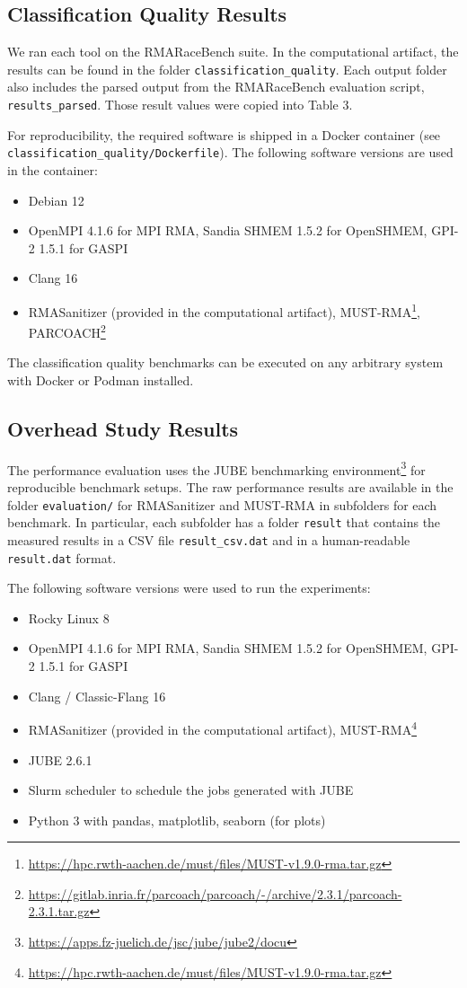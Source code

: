\documentclass[twoside]{article}
\begin{document}
\subsection*{Classification Quality Results}
We ran each tool on the RMARaceBench suite. 
In the computational artifact, the results can be found in the folder \texttt{classification\_quality}.
Each output folder also includes the parsed output from the RMARaceBench evaluation script, \texttt{results\_parsed}.
Those result values were copied into Table 3.

For reproducibility, the required software is shipped in a Docker container (see \texttt{classification\_quality/Dockerfile}). The following software versions are used in the container:
\begin{itemize}
\item Debian 12
\item OpenMPI 4.1.6 for MPI RMA, Sandia SHMEM 1.5.2 for OpenSHMEM, GPI-2 1.5.1 for GASPI
\item Clang 16
\item RMASanitizer (provided in the computational artifact), MUST-RMA\footnote{\url{https://hpc.rwth-aachen.de/must/files/MUST-v1.9.0-rma.tar.gz}}, PARCOACH\footnote{\url{https://gitlab.inria.fr/parcoach/parcoach/-/archive/2.3.1/parcoach-2.3.1.tar.gz}}
\end{itemize}

The classification quality benchmarks can be executed on any arbitrary system with Docker or Podman installed.


\subsection*{Overhead Study Results}
The performance evaluation uses the JUBE benchmarking environment\footnote{\url{https://apps.fz-juelich.de/jsc/jube/jube2/docu}} for reproducible benchmark setups.
The raw performance results are available in the folder \texttt{evaluation/} for RMASanitizer and MUST-RMA in subfolders for each benchmark. In particular, each subfolder has a folder  \texttt{result} that contains the measured results in a CSV file \texttt{result\_csv.dat} and in a human-readable \texttt{result.dat} format.

The following software versions were used to run the experiments:
\begin{itemize}
\item Rocky Linux 8
\item OpenMPI 4.1.6 for MPI RMA, Sandia SHMEM 1.5.2 for OpenSHMEM, GPI-2 1.5.1 for GASPI
\item Clang / Classic-Flang 16
\item RMASanitizer (provided in the computational artifact), MUST-RMA\footnote{\url{https://hpc.rwth-aachen.de/must/files/MUST-v1.9.0-rma.tar.gz}}
\item JUBE 2.6.1
\item Slurm scheduler to schedule the jobs generated with JUBE
\item Python 3 with pandas, matplotlib, seaborn (for plots)
\end{itemize}
\end{document}
